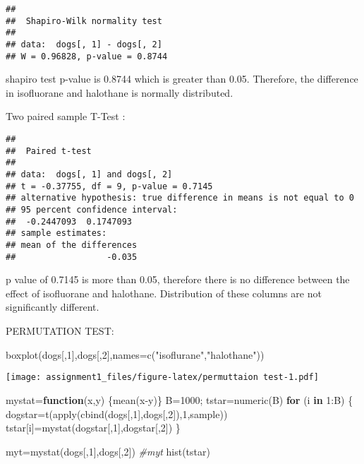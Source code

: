 \documentclass[
]{article}
\newenvironment{Shaded}{\begin{snugshade}}{\end{snugshade}}
\newcommand{\AttributeTok}[1]{\textcolor[rgb]{0.77,0.63,0.00}{#1}}
\newcommand{\CommentTok}[1]{\textcolor[rgb]{0.56,0.35,0.01}{\textit{#1}}}
\newcommand{\ControlFlowTok}[1]{\textcolor[rgb]{0.13,0.29,0.53}{\textbf{#1}}}
\newcommand{\DecValTok}[1]{\textcolor[rgb]{0.00,0.00,0.81}{#1}}
\newcommand{\FunctionTok}[1]{\textcolor[rgb]{0.00,0.00,0.00}{#1}}
\newcommand{\NormalTok}[1]{#1}
\newcommand{\OtherTok}[1]{\textcolor[rgb]{0.56,0.35,0.01}{#1}}
\newcommand{\SpecialCharTok}[1]{\textcolor[rgb]{0.00,0.00,0.00}{#1}}
\newcommand{\StringTok}[1]{\textcolor[rgb]{0.31,0.60,0.02}{#1}}
\begin{document}
\begin{verbatim}
## 
##  Shapiro-Wilk normality test
## 
## data:  dogs[, 1] - dogs[, 2]
## W = 0.96828, p-value = 0.8744
\end{verbatim}

shapiro test p-value is 0.8744 which is greater than 0.05. Therefore,
the difference in isofluorane and halothane is normally distributed.

Two paired sample T-Test :

\begin{verbatim}
## 
##  Paired t-test
## 
## data:  dogs[, 1] and dogs[, 2]
## t = -0.37755, df = 9, p-value = 0.7145
## alternative hypothesis: true difference in means is not equal to 0
## 95 percent confidence interval:
##  -0.2447093  0.1747093
## sample estimates:
## mean of the differences 
##                  -0.035
\end{verbatim}

p value of 0.7145 is more than 0.05, therefore there is no difference
between the effect of isofluorane and halothane. Distribution of these
columns are not significantly different.

PERMUTATION TEST:

\begin{Shaded}
\begin{Highlighting}[]
\FunctionTok{boxplot}\NormalTok{(dogs[,}\DecValTok{1}\NormalTok{],dogs[,}\DecValTok{2}\NormalTok{],}\AttributeTok{names=}\FunctionTok{c}\NormalTok{(}\StringTok{"isoflurane"}\NormalTok{,}\StringTok{"halothane"}\NormalTok{))}
\end{Highlighting}
\end{Shaded}

\texttt{[image: assignment1\_files/figure-latex/permuttaion test-1.pdf]}

\begin{Shaded}
\begin{Highlighting}[]
\NormalTok{mystat}\OtherTok{=}\ControlFlowTok{function}\NormalTok{(x,y) \{}\FunctionTok{mean}\NormalTok{(x}\SpecialCharTok{{-}}\NormalTok{y)\}}
\NormalTok{B}\OtherTok{=}\DecValTok{1000}\NormalTok{; tstar}\OtherTok{=}\FunctionTok{numeric}\NormalTok{(B)}
\ControlFlowTok{for}\NormalTok{ (i }\ControlFlowTok{in} \DecValTok{1}\SpecialCharTok{:}\NormalTok{B) \{}
\NormalTok{  dogstar}\OtherTok{=}\FunctionTok{t}\NormalTok{(}\FunctionTok{apply}\NormalTok{(}\FunctionTok{cbind}\NormalTok{(dogs[,}\DecValTok{1}\NormalTok{],dogs[,}\DecValTok{2}\NormalTok{]),}\DecValTok{1}\NormalTok{,sample))}
\NormalTok{  tstar[i]}\OtherTok{=}\FunctionTok{mystat}\NormalTok{(dogstar[,}\DecValTok{1}\NormalTok{],dogstar[,}\DecValTok{2}\NormalTok{]) \}}

\NormalTok{myt}\OtherTok{=}\FunctionTok{mystat}\NormalTok{(dogs[,}\DecValTok{1}\NormalTok{],dogs[,}\DecValTok{2}\NormalTok{])}
\CommentTok{\#myt}
\FunctionTok{hist}\NormalTok{(tstar)}
\end{Highlighting}
\end{Shaded}
\end{document}

